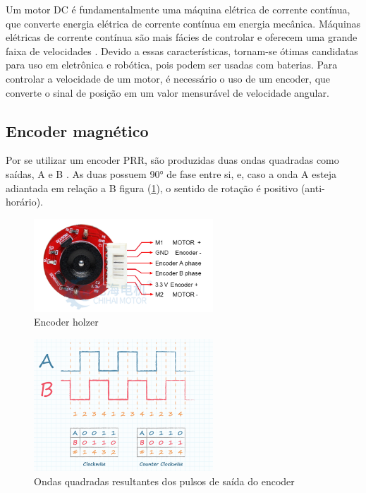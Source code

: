 
Um motor DC é fundamentalmente uma máquina elétrica de corrente contínua, que
converte energia elétrica de corrente contínua em energia mecânica. Máquinas
elétricas de corrente contínua são mais fácies de controlar e oferecem uma
grande faixa de velocidades \cite{Maquinas_eletricas}. Devido a essas
características, tornam-se ótimas candidatas para uso em eletrônica e robótica,
pois podem ser usadas com baterias. Para controlar a velocidade de um motor,
é necessário o uso de um encoder, que converte o sinal de posição em um valor
mensurável de velocidade angular.



\subsection{Encoder magnético}

	Por se utilizar um encoder PRR, são produzidas duas ondas quadradas como saídas,
	A e B \cite{encoder_ppr}. As duas possuem 90° de fase entre si, e, caso a onda A
	esteja adiantada em relação a B figura (\ref{encoder_ppr_ab}), o sentido de rotação é
	positivo (anti-horário).

\begin{figure}[h]
	\centering
	\includegraphics[width=0.6\textwidth]{figures/encoder_holzer}
	\caption{Encoder holzer \cite{motor_dc_6v_encoder}}
\end{figure}

\begin{figure}[h]
	\centering
	\includegraphics[width=0.6\textwidth]{figures/encoder_pulso_ab}
	\caption{Ondas quadradas resultantes dos pulsos de saída do encoder \cite{encoder_ppr}}
	\label{encoder_ppr_ab}
\end{figure}


